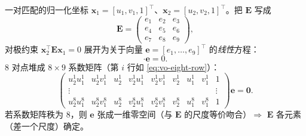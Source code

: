 \begin{derivation}
\label{thm:vo-eight}
一对匹配的归一化坐标 $\mathbf{x}_1=[u_1,v_1,1]^\top$、$\mathbf{x}_2=[u_2,v_2,1]^\top$。把 $\mathbf{E}$ 写成
\[
  \mathbf{E}=\begin{pmatrix}e_1&e_2&e_3\\e_4&e_5&e_6\\e_7&e_8&e_9\end{pmatrix},
\]
对极约束 $\mathbf{x}_2^\top\mathbf{E}\mathbf{x}_1=0$ 展开为关于向量 $\mathbf{e}=[e_1,\dots,e_9]^\top$ 的\emph{线性}方程：
\begin{equation}
  [u_2u_1,\ u_2v_1,\ u_2,\ v_2u_1,\ v_2v_1,\ v_2,\ u_1,\ v_1,\ 1]\cdot\mathbf{e}=0.
  \label{eq:vo-eight-row}
\end{equation}
$8$ 对点堆成 $8\times9$ 系数矩阵（第 $i$ 行如 \cref{eq:vo-eight-row}）：
\begin{equation}
  \begin{pmatrix}
  u_2^1u_1^1 & u_2^1v_1^1 & u_2^1 & v_2^1u_1^1 & v_2^1v_1^1 & v_2^1 & u_1^1 & v_1^1 & 1\\
  \vdots & & & & & & & & \vdots\\
  u_2^8u_1^8 & u_2^8v_1^8 & u_2^8 & v_2^8u_1^8 & v_2^8v_1^8 & v_2^8 & u_1^8 & v_1^8 & 1
  \end{pmatrix}\mathbf{e}=\mathbf{0}.
  \label{eq:vo-eight-sys}
\end{equation}
若系数矩阵秩为 $8$，则 $\mathbf{e}$ 张成一维零空间（与 $\mathbf{E}$ 的尺度等价吻合）$\Rightarrow$ $\mathbf{E}$ 各元素（差一个尺度）确定。
\end{derivation}

